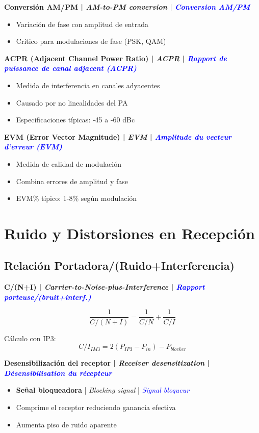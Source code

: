 \documentclass[a4paper,10pt]{article}
\begin{document}
\textbf{Conversión AM/PM | \textit{AM-to-PM conversion} | \textcolor{blue}{\textit{Conversion AM/PM}}}
\begin{itemize}[leftmargin=*]
    \item Variaci\'on de fase con amplitud de entrada
    \item Cr\'itico para modulaciones de fase (PSK, QAM)
\end{itemize}

\textbf{ACPR (Adjacent Channel Power Ratio) | \textit{ACPR} | \textcolor{blue}{\textit{Rapport de puissance de canal adjacent (ACPR)}}}
\begin{itemize}[leftmargin=*]
    \item Medida de interferencia en canales adyacentes
    \item Causado por no linealidades del PA
    \item Especificaciones t\'ipicas: -45 a -60 dBc
\end{itemize}

\textbf{EVM (Error Vector Magnitude) | \textit{EVM} | \textcolor{blue}{\textit{Amplitude du vecteur d'erreur (EVM)}}}
\begin{itemize}[leftmargin=*]
    \item Medida de calidad de modulaci\'on
    \item Combina errores de amplitud y fase
    \item EVM\% t\'ipico: 1-8\% seg\'un modulaci\'on
\end{itemize}

\section{Ruido y Distorsiones en Recepción}

\subsection{Relación Portadora/(Ruido+Interferencia)}

\textbf{C/(N+I) | \textit{Carrier-to-Noise-plus-Interference} | \textcolor{blue}{\textit{Rapport porteuse/(bruit+interf.)}}}

$$\frac{1}{C/(N+I)} = \frac{1}{C/N} + \frac{1}{C/I}$$

Cálculo con IP3:
$$C/I_{IM3} = 2(P_{IP3} - P_{in}) - P_{blocker}$$

\textbf{Desensibilizaci\'on del receptor | \textit{Receiver desensitization} | \textcolor{blue}{\textit{D\'esensibilisation du r\'ecepteur}}}
\begin{itemize}[leftmargin=*]
    \item \textbf{Se\~nal bloqueadora} | \textit{Blocking signal} | \textcolor{blue}{\textit{Signal bloqueur}}
    \item Comprime el receptor reduciendo ganancia efectiva
    \item Aumenta piso de ruido aparente
\end{itemize}
\end{document}
